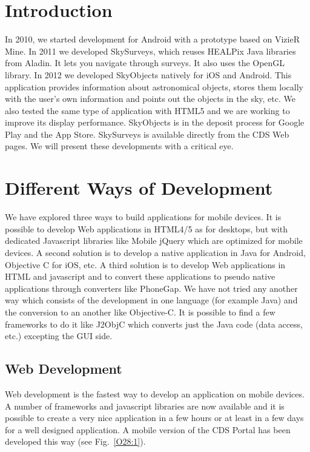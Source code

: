 \section{Introduction}
In 2010, we started development for Android with a prototype based on VizieR Mine. In 2011 we developed SkySurveys, which reuses HEALPix Java libraries from Aladin. It lets you navigate through surveys. It also uses the OpenGL library. In 2012 we developed SkyObjects natively for iOS and Android. This application provides information about astronomical objects, stores them locally with the user's own information and points out the objects in the sky, etc. We also tested the same type of application with HTML5 and we are working to improve its display performance. SkyObjects is in the deposit process for Google Play and the App Store. SkySurveys is available directly from the CDS Web pages. We will present these developments with a critical eye.

\section{Different Ways of Development}

We have explored three ways to build applications for mobile devices.
It is possible to develop Web applications in HTML4/5 as for desktops, but with dedicated Javascript libraries like Mobile jQuery which are optimized for mobile devices.
A second solution is to develop a native application in Java for Android, Objective C for iOS, etc. 
A third solution is to develop Web applications in HTML and javascript and to convert these applications to pseudo native applications through converters like PhoneGap.
We have not tried any another way which consists of the development in one language (for example Java) and the conversion to an another like Objective-C. It is possible to find a few frameworks to do it like J2ObjC which converts just the Java code (data access, etc.) excepting the GUI side.

\subsection{Web Development}
Web development is the fastest way to develop an application on mobile devices. A number of frameworks and javascript libraries are now available and it is possible to create a very nice application in a few hours or at least in a few days for a well designed application.
A mobile version of the CDS Portal has been developed this way (see Fig.~\ref{O28:1}).

